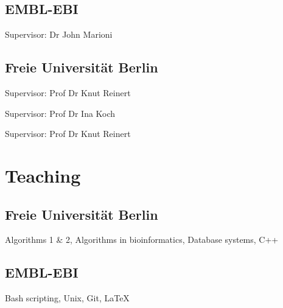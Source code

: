 \documentclass{klmr-cv}
\newcommand*\cpp{C++}
\begin{document}
\subsection{EMBL-EBI}

\date{2011--2014}
\item{}
\date{2014--2015}
\item{\mbox{}}
\item{Supervisor: Dr John Marioni}

\subsection{Freie Universität Berlin}

\date{2010--2011}
\item{}
\item{Supervisor: Prof Dr Knut Reinert}

\date{2009}
\item{}
\item{Supervisor: Prof Dr Ina Koch}

\date{2008}
\item{}
\item{Supervisor: Prof Dr Knut Reinert}

\section{Teaching}

\subsection{Freie Universität Berlin}

\date{2008--2011}
\item{}
\item{Algorithms 1 \& 2, Algorithms in bioinformatics, Database systems, \cpp}

\subsection{EMBL-EBI}

\date{2011--2014}
\item{}
\item{Bash scripting, Unix, Git, \LaTeX}
\end{document}
